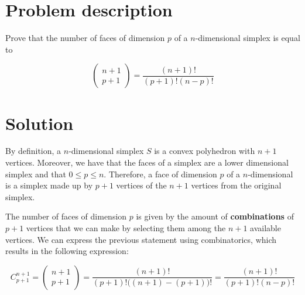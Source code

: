 \documentclass[11pt,a4paper]{article}
\begin{document}
\setlength{\parskip}{1em}


\section{Problem description}

Prove that the number of faces of dimension $p$ of a $n$-dimensional simplex
is equal to

\[
\begin{pmatrix}
  n + 1 \\
  p + 1
\end{pmatrix}
=
\frac{(n+1)!}{(p+1)!(n-p)!}
\]

\section{Solution}

By definition, a $n$-dimensional simplex $S$ is a convex polyhedron with $n + 1$ vertices.
Moreover, we have that the faces of a simplex are a lower dimensional simplex and that $0 \leq p \leq n$.
Therefore, a face of dimension $p$ of a $n$-dimensional is a simplex made up by $p + 1$ vertices
of the $n + 1$ vertices from the original simplex.

The number of faces of dimension $p$ is given by the amount of \textbf{combinations} of $p + 1$ vertices
that we can make by selecting them among the $n + 1$ available vertices. We can express the
previous statement using combinatorics, which results in the following expression:

\[
  C^{n+1}_{p+1} =
 \begin{pmatrix}
    n + 1 \\
    p + 1
  \end{pmatrix}
  =
  \frac{(n+1)!}{(p+1)!\big((n+1) - (p+1)\big)!}
  =
  \frac{(n+1)!}{(p+1)!(n-p)!}
\]
\end{document}
